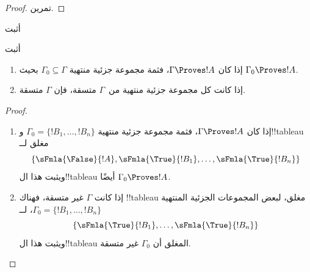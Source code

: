 \documentclass[../../../include/open-logic-section]{subfiles}
\begin{document}
\begin{proof}
تمرين.
\end{proof}

\begin{prob}
أثبت 
\end{prob}
\tagendprob

\begin{prob}
أثبت 
\end{prob}
\tagendprob

\begin{prop}[التراص]
  \begin{enumerate}
  \item إذا كان $\Gamma \Proves !A$، فثمة مجموعة جزئية منتهية $\Gamma_0
    \subseteq \Gamma$ بحيث $\Gamma_0 \Proves !A$.
  \item إذا كانت كل مجموعة جزئية منتهية من~$\Gamma$ متسقة، فإن $\Gamma$
    متسقة.
  \end{enumerate}
\end{prop}

\begin{proof}
  \begin{enumerate}
    \item إذا كان $\Gamma \Proves !A$، فثمة مجموعة جزئية منتهية
      $\Gamma_0 = \{!B_1, \dots, !B_n\}$ و!!{tableau} مغلق لــ
      \[
      \{\sFmla{\False}{!A}, \sFmla{\True}{!B_1}, \dots, \sFmla{\True}{!B_n}\}
      \]
      ويثبت هذا ال!!{tableau} أيضًا $\Gamma_0 \Proves !A$.
    \item إذا كانت $\Gamma$ غير متسقة، فهناك !!{tableau} مغلق، لبعض
      المجموعات الجزئية المنتهية
      $\Gamma_0 = \{!B_1, \dots, !B_n\}$، لــ
      \[
      \{\sFmla{\True}{!B_1}, \dots, \sFmla{\True}{!B_n}\}
      \]
      ويثبت هذا ال!!{tableau} المغلق أن $\Gamma_0$ غير متسقة.
  \end{enumerate}
\end{proof}
\end{document}
